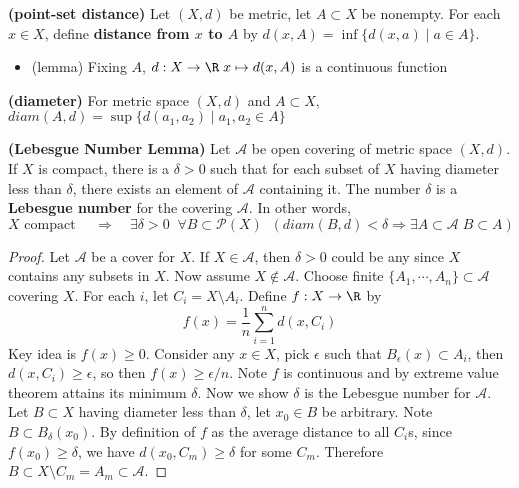\documentclass[10.5pt]{article}
\newcommand{\calA}{\mathcal{A}}
\newcommand{\calP}{\mathcal{P}}
\begin{document}
\begin{defn*}
    \textbf{(point-set distance)} Let $(X,d)$ be metric, let $A\subset X$ be nonempty. For each $x\in X$, define \textbf{distance from $x$ to $A$} by $d(x,A) = \inf \{d(x,a)\mid a\in A\}$. 
    \begin{itemize}
        \item (lemma) Fixing $A$, $d: X\to \R \; x \mapsto d(x,A)$ is a continuous function 
    \end{itemize}
\end{defn*}

\begin{defn*}
    \textbf{(diameter)} For metric space $(X,d)$ and $A\subset X$,  $diam(A,d) = \sup \{d(a_1,a_2) \mid a_1,a_2 \in A\}$
\end{defn*}

\begin{lemma*}
    \textbf{(Lebesgue Number Lemma)} Let $\calA$ be open covering of metric space $(X,d)$. If $X$ is compact, there is a $\delta > 0$ such that for each subset of $X$ having diameter less than $\delta$, there exists an element of $\calA$ containing it. The number $\delta$ is a \textbf{Lebesgue number} for the covering $\calA$. In other words, 
    \[
        X \text{ compact } \quad \Rightarrow \quad
        \exists \delta > 0 \;\; \forall B\subset \calP(X) \;\; ( diam(B,d) < \delta  \Rightarrow  \exists A\subset \calA \;  B\subset A )
    \]
    \begin{proof}
        Let $\calA$ be a cover for $X$. If $X \in \calA$, then $\delta>0$ could be any since $X$ contains any subsets in $X$. Now assume $X\not\in \calA$. Choose finite $\{A_1, \cdots, A_n\} \subset \calA$ covering $X$. For each $i$, let $C_i = X \setminus A_i$. Define $f:X\to\R$ by 
        \[
            f(x) = \frac{1}{n} \sum_{i=1}^n d(x, C_i)    
        \]
        Key idea is $f(x) \geq 0$. Consider any $x\in X$, pick $\epsilon$ such that $B_{\epsilon}(x)\subset A_i$, then $d(x,C_i) \geq \epsilon$, so then $f(x) \geq \epsilon /n$. Note $f$ is continuous and by extreme value theorem attains its minimum $\delta$. Now we show $\delta$ is the Lebesgue number for $\calA$. Let $B\subset X$ having diameter less than $\delta$, let $x_0\in B$ be arbitrary. Note $B\subset B_{\delta}(x_0)$. By definition of $f$ as the average distance to all $C_i$s, since $f(x_0) \geq \delta$, we have $d(x_0, C_m) \geq \delta$ for some $C_m$. Therefore $B\subset X \setminus C_m = A_m \subset \calA$.
    \end{proof}
\end{lemma*}
\end{document}
